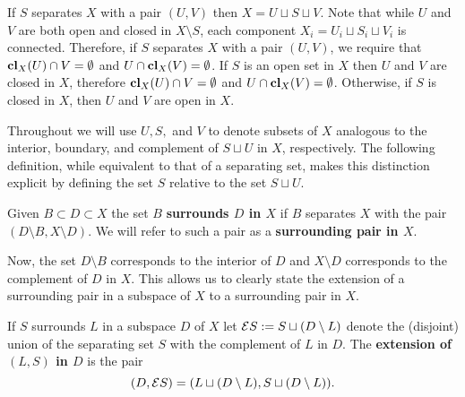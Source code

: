 If $S$ separates $X$ with a pair $(U, V)$ then $X = U\sqcup S\sqcup V$.
Note that while $U$ and $V$ are both open and closed in $X\setminus S$, each component $X_i = U_i\sqcup S_i\sqcup V_i$ is connected.
Therefore, if $S$ separates $X$ with a pair $(U, V)$, we require that $\mathbf{cl}_X(U)\cap V = \emptyset$ and $U\cap \mathbf{cl}_X(V) = \emptyset$.
If $S$ is an open set in $X$ then $U$ and $V$ are closed in $X$, therefore $\mathbf{cl}_X(U)\cap V = \emptyset$ and $U\cap \mathbf{cl}_X(V) = \emptyset$.
Otherwise, if $S$ is closed in $X$, then $U$ and $V$ are open in $X$.


Throughout we will use $U, S,$ and $V$ to denote subsets of $X$ analogous to the interior, boundary, and complement of $S\sqcup U$ in $X$, respectively.
The following definition, while equivalent to that of a separating set, makes this distinction explicit by defining the set $S$ relative to the set $S\sqcup U$.

\begin{definition}[Surrounding]
  Given $B\subset D \subset X$ the set $B$ \textbf{surrounds $D$ in $X$} if $B$ separates $X$ with the pair $(D\setminus B, X\setminus D)$.
  We will refer to such a pair as a \textbf{surrounding pair in $X$}.
\end{definition}

Now, the set $D\setminus B$ corresponds to the interior of $D$ and $X\setminus D$ corresponds to the complement of $D$ in $X$.
This allows us to clearly state the extension of a surrounding pair in a subspace of $X$ to a surrounding pair in $X$.

\begin{definition}[Extension]
  If $S$ surrounds $L$ in a subspace $D$ of $X$ let $\mathcal{E} S := S\sqcup (D\setminus L)$ denote the (disjoint) union of the separating set $S$ with the complement of $L$ in $D$.
  The \textbf{extension of $(L, S)$ in $D$} is the pair
  \[ (D, \mathcal{E} S) = (L\sqcup (D\setminus L), S\sqcup (D\setminus L)).\]
\end{definition}

